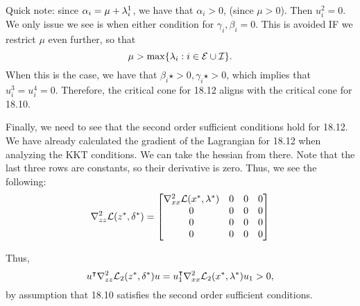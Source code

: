 \begin{solution}
    Quick note: since $\alpha_i = \mu + \mathrm{\lambda}_i^1$, we have that $\alpha_i > 0$, (since $\mu > 0$). Then $u_i^2 = 0$. We only issue we see is when either condition for $\gamma_i, \beta_i = 0$. This is avoided IF we restrict $\mu$ even further, so that 
    \[\mu > \max\{ \mathrm{\lambda}_i : i \in \mathcal{E} \cup \mathcal{I}\}.\]
    When this is the case, we have that $\beta_i\star > 0, \gamma_i\star > 0$, which implies that $u_i^3 = u_i^4 = 0$. Therefore, the critical cone for 18.12 aligns with the critical cone for 18.10.

    \newpage
    Finally, we need to see that the second order sufficient conditions hold for 18.12. We have already calculated the gradient of the Lagrangian for 18.12 when analyzing the KKT conditions. We can take the hessian from there. Note that the last three rows are constants, so their derivative is zero. Thus, we see the following:
\[
\grad_{zz}^2 \scL(z\star, \delta\star) = \mqty[
    \grad_{xx}^2\scL(x\star, \lm\star) & 0 & 0 & 0 \\
    0 & 0 & 0 & 0 \\
    0 & 0 & 0 & 0 \\
    0 & 0 & 0 & 0
]
\]

    Thus, 
    \[u^{\intercal}\nabla^2_{zz}\mathcal{L}_2(z^{*}, \delta^{*}) u = u_1^{\intercal}\nabla^2_{xx}\mathcal{L}_2(x^{*}, \mathrm{\lambda}^{*}) u_1 > 0,\]
    by assumption that 18.10 satisfies the second order sufficient conditions. 
\end{solution}

\newpage
